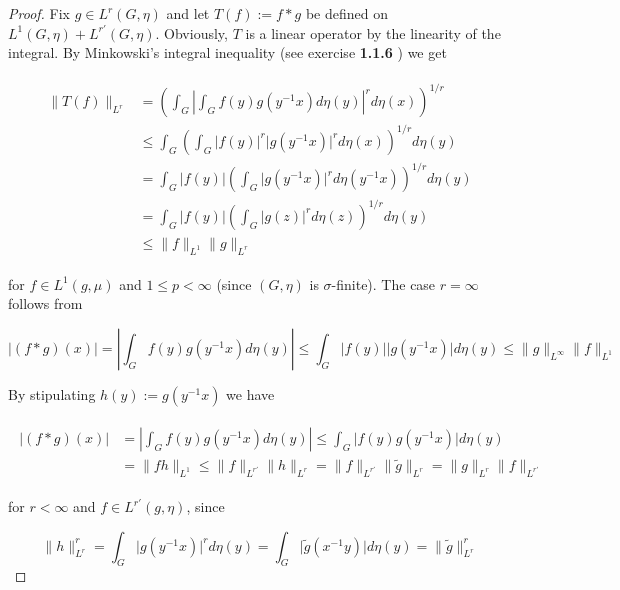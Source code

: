 \begin{proof}
	Fix $g \in L^r(G,\eta)$ and let $T(f) := f \ast g$ be defined on $L^1(G,\eta) + L^{r'}(G,\eta)$. Obviously, $T$ is a linear operator by the linearity of the integral. By Minkowski's integral inequality (see exercise \textbf{1.1.6} \cite[13]{grafakos:fourier:2014}) we get

	\begin{gather}
		\begin{aligned}
			\|T(f)\|_{L^r} &= \left(\int_G \left\vert \int_G f(y)g(y^{-1}x) d\eta(y)\right\vert^r d\eta(x)\right)^{1/r}\\
			&\leqslant \int_G \left( \int_G \vert f(y) \vert^r \vert g(y^{-1}x) \vert^r d\eta(x)\right)^{1/r} d\eta(y)\\
			&= \int_G \vert f(y) \vert \left( \int_G \vert g(y^{-1}x) \vert^r d\eta(y^{-1}x) \right)^{1/r} d\eta(y)\\
			&= \int_G \vert f(y) \vert \left( \int_G \vert g(z) \vert^r d\eta(z) \right)^{1/r} d\eta(y)\\
			&\leqslant \|f\|_{L^1} \|g\|_{L^r}
		\end{aligned} 
	\end{gather}

	for $f \in L^1(g,\mu)$ and $1 \leqslant p < \infty$ (since $(G,\eta)$ is $\sigma$-finite). The case $r = \infty$ follows from
	
	\begin{equation}
		\vert (f \ast g)(x) \vert = \left\vert \int_G f(y)g(y^{-1}x) d\eta(y)\right\vert \leqslant \int_G \vert f(y)\vert \vert g(y^{-1}x)\vert d\eta(y) \leqslant \|g\|_{L^\infty}\|f\|_{L^1}
	\end{equation}
	
	By stipulating $h(y) := g(y^{-1}x)$ we have 

	\begin{gather}
		\begin{aligned}
			\vert (f \ast g)(x) \vert &= \left\vert \int_G f(y)g(y^{-1}x) d\eta(y)\right\vert \leqslant \int_G \vert f(y)g(y^{-1}x)\vert d\eta(y)\\
			&= \|fh\|_{L^1} \leqslant \|f\|_{L^{r'}} \|h\|_{L^r} = \|f\|_{L^{r'}} \|\tilde{g}\|_{L^r} = \|g\|_{L^r} \|f\|_{L^{r'}}
		\end{aligned}
	\end{gather}

	for $r < \infty$ and $f \in L^{r'}(g,\eta)$, since

	\begin{equation*}
		\|h\|^r_{L^r} = \int_G \vert g(y^{-1}x)\vert^r d\eta(y) = \int_G \vert\tilde{g}(x^{-1}y)\vert d\eta(y) = \|\tilde{g}\|^r_{L^{r}}
	\end{equation*}


\end{proof}
